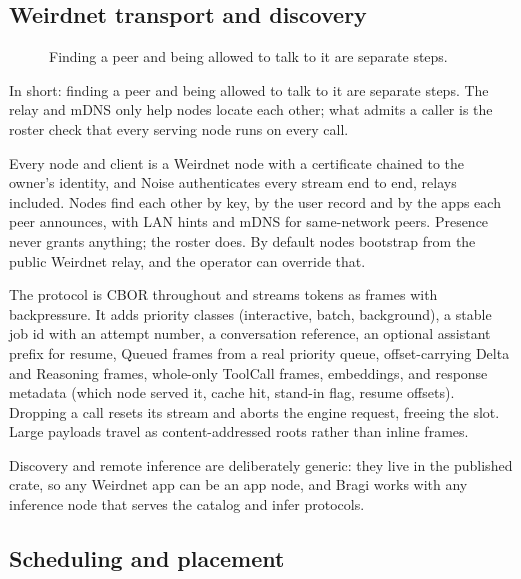 \subsection{Weirdnet transport and discovery}\label{sec:transport}

\begin{figure}[htbp]
\centering
{}
\caption{Finding a peer and being allowed to talk to it are separate steps.}
\end{figure}

In short: finding a peer and being allowed to talk to it are separate steps. The relay and mDNS
only help nodes locate each other; what admits a caller is the roster check that every serving
node runs on every call.

Every node and client is a Weirdnet node with a certificate chained to the owner's identity, and
Noise authenticates every stream end to end, relays included. Nodes find each other by key, by
the user record and by the apps each peer announces, with LAN hints and mDNS for same-network
peers. Presence never grants anything; the roster does. By default nodes bootstrap from the
public Weirdnet relay, and the operator can override that.

The  protocol is CBOR throughout and streams tokens as frames with backpressure.
It adds priority classes (interactive, batch, background), a stable job id with an attempt
number, a conversation reference, an optional assistant prefix for resume, Queued frames from a
real priority queue, offset-carrying Delta and Reasoning frames, whole-only ToolCall frames,
embeddings, and response metadata (which node served it, cache hit, stand-in flag, resume
offsets). Dropping a call resets its stream and aborts the engine request, freeing the slot.
Large payloads travel as content-addressed roots rather than inline frames.

Discovery and remote inference are deliberately generic: they live in the published
 crate, so any Weirdnet app can be an app node, and Bragi works with any
inference node that serves the catalog and infer protocols.

\subsection{Scheduling and placement}\label{sec:scheduling}

